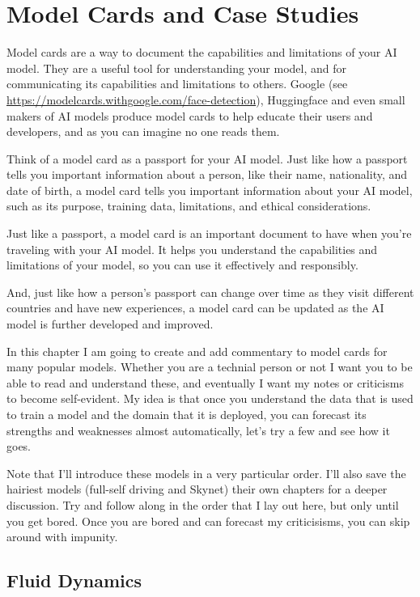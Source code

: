 \setchapterpreamble[u]{\margintoc}
\chapter{Model Cards and Case Studies}

Model cards are a way to document the capabilities and limitations of your AI model. They are a useful tool for understanding your model, and for communicating its capabilities and limitations to others. Google (see \url{https://modelcards.withgoogle.com/face-detection}), Huggingface and even small makers of AI models produce model cards to help educate their users and developers, and as you can imagine no one reads them. 

Think of a model card as a passport for your AI model. Just like how a passport tells you important information about a person, like their name, nationality, and date of birth, a model card tells you important information about your AI model, such as its purpose, training data, limitations, and ethical considerations.

Just like a passport, a model card is an important document to have when you're traveling with your AI model. It helps you understand the capabilities and limitations of your model, so you can use it effectively and responsibly.

And, just like how a person's passport can change over time as they visit different countries and have new experiences, a model card can be updated as the AI model is further developed and improved.

In this chapter I am going to create and add commentary to model cards for many popular models. Whether you are a technial person or not I want you to be able to read and understand these, and eventually I want my notes or criticisms to become self-evident. My idea is that once you understand the data that is used to train a model and the domain that it is deployed, you can forecast its strengths and weaknesses almost automatically, let's try a few and see how it goes.

Note that I'll introduce these models in a very particular order. I'll also save the hairiest models (full-self driving and Skynet) their own chapters for a deeper discussion. Try and follow along in the order that I lay out here, but only until you get bored. Once you are bored and can forecast my criticisisms, you can skip around with impunity.

\section{Fluid Dynamics}


